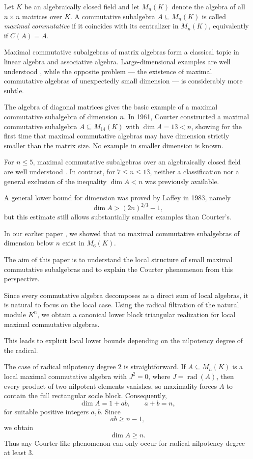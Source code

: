 \documentclass[11pt]{article}
\theoremstyle{remark}
\theoremstyle{plain}
\theoremstyle{definition}
\theoremstyle{myremark}
\begin{document}
Let $K$ be an algebraically closed field and let $M_n(K)$ denote the algebra of all $n\times n$ matrices over $K$. A commutative subalgebra $A\subseteq M_n(K)$ is called \emph{maximal commutative} if it coincides with its centralizer in $M_n(K)$, equivalently if $C(A)=A$.

Maximal commutative subalgebras of matrix algebras form a classical topic in linear algebra and associative algebra. Large-dimensional examples are well understood \cite{Brown1997}, while the opposite problem — the existence of maximal commutative algebras of unexpectedly small dimension — is considerably more subtle.

The algebra of diagonal matrices gives the basic example of a maximal commutative subalgebra of dimension $n$. In 1961, Courter \cite{Courter1961} constructed a maximal commutative subalgebra $A\subseteq M_{14}(K)$ with $\dim A=13<n$, showing for the first time that maximal commutative algebras may have dimension strictly smaller than the matrix size. No example in smaller dimension is known.


For $n\le 5$, maximal commutative subalgebras over an algebraically closed field are well understood  \cite{Song1999}. In contrast, for $7\le n\le 13$, neither a classification nor a general exclusion of the inequality $\dim A<n$ was previously available.

A general lower bound for dimension was proved by Laffey \cite{Laffey1983} in 1983, namely
\[\dim A>(2n)^{2/3}-1,\]
but this estimate still allows substantially smaller examples than Courter's.

In our earlier paper \cite{NowakKepczyk}, we showed that no maximal commutative subalgebras of dimension below $n$ exist in $M_6(K)$.

The aim of this paper is to understand the local structure of small
maximal commutative subalgebras and to explain the Courter phenomenon
from this perspective.

Since every commutative algebra decomposes as a direct sum of local algebras, it is natural to focus on the local case. Using the radical filtration
of the natural module \(K^n\), we obtain a canonical lower block
triangular realization for local maximal commutative algebras.

This leads to explicit local lower bounds depending on the nilpotency
degree of the radical. 

The case of radical nilpotency degree $2$ is straightforward. If $A \subseteq M_n(K)$ is a local maximal commutative algebra with $J^2=0$, where $J=\operatorname{rad}(A)$, then every product of two nilpotent elements vanishes, so maximality forces $A$ to contain the full rectangular socle block. Consequently,
\[
\dim A = 1+ab,
\qquad a+b=n,
\]
for suitable positive integers $a,b$. Since
\[
ab \ge n-1,
\]
we obtain
\[
\dim A \ge n.
\]
Thus any Courter-like phenomenon can only occur for radical nilpotency degree at least $3$.
\end{document}
